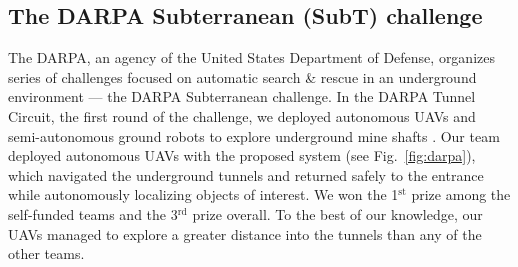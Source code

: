\documentclass[a4paper,11pt,titlepage,twoside]{book}
\newcommand{\reffig}[1]{Fig.~\ref{#1}}
\begin{document}

\subsection{The DARPA Subterranean (SubT) challenge}

The \ac{DARPA}, an agency of the United States Department of Defense, organizes series of challenges focused on automatic search \& rescue in an underground environment --- the \ac{DARPA} Subterranean challenge.
In the \ac{DARPA} Tunnel Circuit, the first round of the challenge, we deployed autonomous \acp{UAV} and semi-autonomous ground robots to explore underground mine shafts \cite{petrlik2020robust, roucek2019darpa}.
Our team deployed autonomous \acp{UAV} with the proposed system (see \reffig{fig:darpa}), which navigated the underground tunnels and returned safely to the entrance while autonomously localizing objects of interest.
We won the 1$^{\mathrm{st}}$ prize among the self-funded teams and the 3$^{\mathrm{rd}}$ prize overall.
To the best of our knowledge, our \acp{UAV} managed to explore a greater distance into the tunnels than any of the other teams.

\end{document}
